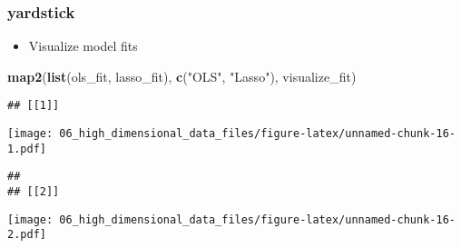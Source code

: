 \documentclass[
]{book}
\newenvironment{Shaded}{\begin{snugshade}}{\end{snugshade}}
\newcommand{\KeywordTok}[1]{\textcolor[rgb]{0.13,0.29,0.53}{\textbf{#1}}}
\newcommand{\NormalTok}[1]{#1}
\newcommand{\StringTok}[1]{\textcolor[rgb]{0.31,0.60,0.02}{#1}}
\providecommand{\tightlist}{%
  \setlength{\itemsep}{0pt}\setlength{\parskip}{0pt}}
\begin{document}
\hypertarget{yardstick}{%
\subsubsection{yardstick}\label{yardstick}}

\begin{itemize}
\tightlist
\item
  Visualize model fits
\end{itemize}

\begin{Shaded}
\begin{Highlighting}[]
\KeywordTok{map2}\NormalTok{(}\KeywordTok{list}\NormalTok{(ols\_fit, lasso\_fit), }\KeywordTok{c}\NormalTok{(}\StringTok{"OLS"}\NormalTok{, }\StringTok{"Lasso"}\NormalTok{), visualize\_fit) }
\end{Highlighting}
\end{Shaded}

\begin{verbatim}
## [[1]]
\end{verbatim}

\texttt{[image: 06\_high\_dimensional\_data\_files/figure-latex/unnamed-chunk-16-1.pdf]}

\begin{verbatim}
## 
## [[2]]
\end{verbatim}

\texttt{[image: 06\_high\_dimensional\_data\_files/figure-latex/unnamed-chunk-16-2.pdf]}
\end{document}
